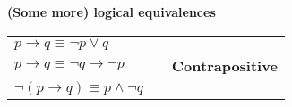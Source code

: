 
{\bf (Some more) logical equivalences}


\begin{tabular}{llp{3in}}
    $p \to q \equiv \lnot p \lor q$ & & \\
    $p \to q \equiv \lnot q \to \lnot p$ & &{\bf Contrapositive} \\
    $\lnot (p \to q) \equiv p\land \lnot q$  & &\\
\end{tabular}